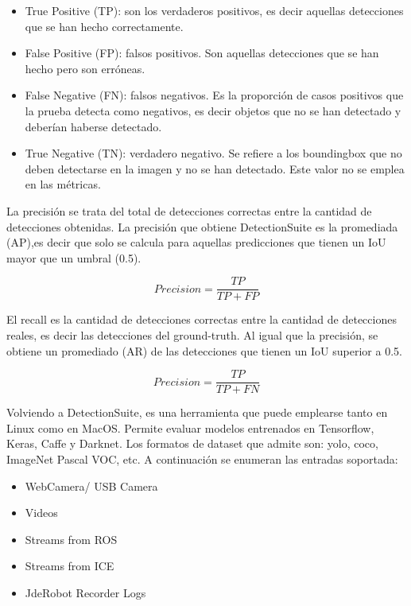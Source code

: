 \begin{itemize}
    \item True Positive (TP): son los verdaderos positivos, es decir aquellas detecciones que se han hecho correctamente.
    \item False Positive (FP): falsos positivos. Son aquellas detecciones que se han hecho pero son erróneas.
    \item False Negative (FN): falsos negativos. Es la proporción de casos positivos que la prueba detecta como negativos, es decir objetos que no se han detectado y deberían haberse detectado.
    \item True Negative (TN): verdadero negativo. Se refiere a los boundingbox que no deben detectarse en la imagen y no se han detectado. Este valor no se emplea en las métricas.
\end{itemize}

La precisión se trata del total de detecciones correctas entre la cantidad de detecciones obtenidas. La precisión que obtiene DetectionSuite es la promediada (AP),es decir que solo se calcula para aquellas predicciones que tienen un IoU mayor que un umbral (0.5).

\begin{equation}\label{precision}
Precision = \frac{TP}{TP + FP}
\end{equation}

El recall es la cantidad de detecciones correctas entre la cantidad de detecciones reales, es decir las detecciones del ground-truth. Al igual que la precisión, se obtiene un promediado (AR) de las detecciones que tienen un IoU superior a 0.5.

\begin{equation}\label{recall}
Precision = \frac{TP}{TP + FN}
\end{equation}

Volviendo a DetectionSuite, es una herramienta que puede emplearse tanto en Linux como en MacOS. Permite evaluar modelos entrenados en Tensorflow, Keras, Caffe y Darknet. Los formatos de dataset que admite son: \acrshort{yolo}, \acrshort{coco}, ImageNet
Pascal VOC, etc. A continuación se enumeran las entradas soportada:

\begin{itemize}
    \item WebCamera/ USB Camera
    \item Videos
    \item Streams from ROS
    \item Streams from ICE
    \item JdeRobot Recorder Logs
\end{itemize}

